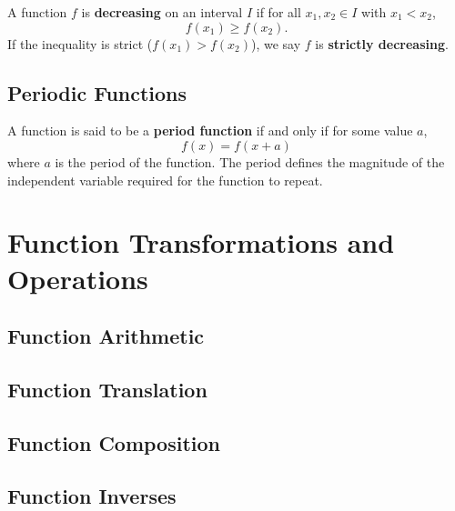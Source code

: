 \begin{definition}
    A function $f$ is \textbf{decreasing} on an interval $I$ if for all $x_1, x_2 \in I$ with $x_1 < x_2$,
    $$
    f(x_1) \geq f(x_2).
    $$
    If the inequality is strict ($f(x_1) > f(x_2)$), we say $f$ is \textbf{strictly decreasing}.
\end{definition}

\subsection{Periodic Functions}\label{sect:periodic functions}

\begin{definition}
    A function is said to be a \textbf{period function} if and only if for some value $a$,
    $$
    f(x) = f(x+a)
    $$
    where $a$ is the period of the function. The period defines the magnitude of the independent variable required for the function to repeat.
\end{definition}

\section{Function Transformations and Operations}\label{sect:function transformations and operations}

\subsection{Function Arithmetic}\label{sect:function arithmetic}

\subsection{Function Translation}\label{sect:function translation}

\subsection{Function Composition}\label{sect:function composition}

\subsection{Function Inverses}\label{sect:function inverses}
